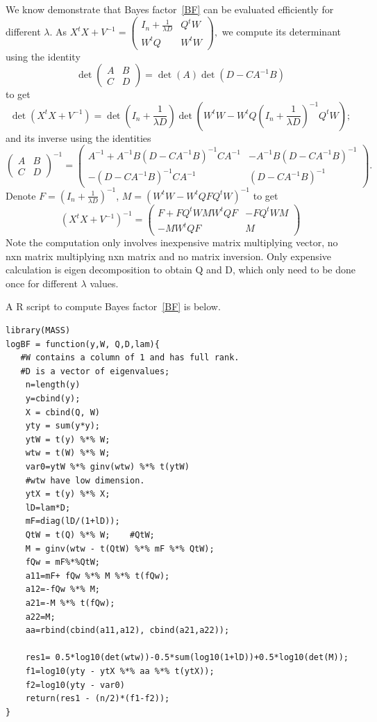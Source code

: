 \documentclass[11pt,Times]{article}
\begin{document}
We know demonstrate that Bayes factor~\eqref{BF} can be evaluated efficiently for different $\lambda$. As $X^tX + V^{-1} = \left( \begin{smallmatrix} I_n+\frac{1}{\lambda D}  & Q^t W \\  W^t Q & W^tW  \end{smallmatrix} \right),$
we compute its determinant using the identity $$\det  \left( \begin{smallmatrix} A & B \\ C & D \end{smallmatrix} \right) = \det(A) \det(D-C A^{-1} B)$$ to get 
%
$$\det(X^tX + V^{-1}) = \det(I_n+\frac{1}{\lambda D}) \det(W^tW - W^t Q (I_n +\frac{1}{\lambda D})^{-1} Q^t W);$$
%
and  its inverse using the identities $$ \left( \begin{smallmatrix} A & B \\ C & D \end{smallmatrix} \right)^{-1} =  \left( \begin{smallmatrix} A^{-1} + A^{-1}B(D-CA^{-1}B)^{-1}C A^{-1} & -A^{-1}B(D-CA^{-1}B)^{-1} \\ -(D-CA^{-1}B)^{-1}C A^{-1} & (D-CA^{-1}B)^{-1} \end{smallmatrix} \right).$$  
Denote $F=(I_n+\frac{1}{\lambda D})^{-1}$, $M = (W^tW - W^t Q F Q^t W)^{-1}$ to get 
%
$$(X^tX + V^{-1})^{-1} = \left( \begin{smallmatrix} F+F Q^t W M W^t Q F & -F Q^t W M \\ -M W^t Q F& M \end{smallmatrix} \right) $$
%
Note the computation only involves inexpensive matrix multiplying vector, no nxn matrix multiplying nxn matrix and no matrix inversion. Only expensive calculation is eigen decomposition to obtain Q and D, which only need to be done once for different $\lambda$ values. 
\medskip

A R script to compute Bayes factor~\eqref{BF} is below. 

\begin{verbatim}
library(MASS)
logBF = function(y,W, Q,D,lam){
   #W contains a column of 1 and has full rank. 
   #D is a vector of eigenvalues; 
    n=length(y)
    y=cbind(y);
    X = cbind(Q, W)
    yty = sum(y*y);
    ytW = t(y) %*% W; 
    wtw = t(W) %*% W;
    var0=ytW %*% ginv(wtw) %*% t(ytW)  
    #wtw have low dimension.  
    ytX = t(y) %*% X;
    lD=lam*D;
    mF=diag(lD/(1+lD));
    QtW = t(Q) %*% W;    #QtW; 
    M = ginv(wtw - t(QtW) %*% mF %*% QtW);
    fQw = mF%*%QtW;
    a11=mF+ fQw %*% M %*% t(fQw);
    a12=-fQw %*% M;
    a21=-M %*% t(fQw);
    a22=M;
    aa=rbind(cbind(a11,a12), cbind(a21,a22));
    
    res1= 0.5*log10(det(wtw))-0.5*sum(log10(1+lD))+0.5*log10(det(M));
    f1=log10(yty - ytX %*% aa %*% t(ytX));
    f2=log10(yty - var0)
    return(res1 - (n/2)*(f1-f2));
}

\end{verbatim}
\end{document}
